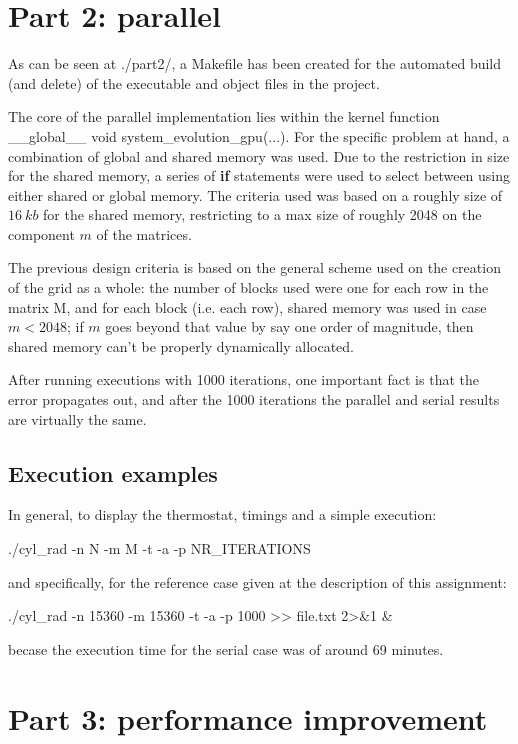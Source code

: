 \documentclass[paper=a4, fontsize=11pt]{scrartcl} %
\numberwithin{equation}{section} %
\numberwithin{figure}{section} %
\numberwithin{table}{section} %
\begin{document}
\section{Part 2: parallel}

As can be seen at ./part2/, a Makefile has been created for the automated build (and delete) of the executable and object files in the project.

The core of the parallel implementation lies within the kernel function \_\_global\_\_ void system\_evolution\_gpu(...). For the specific problem at hand, a combination of global and shared memory was used. Due to the restriction in size for the shared memory, a series of \textbf{if} statements were used to select between using either shared or global memory. The criteria used was based on a roughly size of $16 \ kb$ for the shared memory, restricting to a max size of roughly 2048 on the component $m$ of the matrices.

The previous design criteria is based on the general scheme used on the creation of the grid as a whole: the number of blocks used were one for each row in the matrix M, and for each block (i.e. each row), shared memory was used in case $m<2048$; if $m$ goes beyond that value by say one order of magnitude, then shared memory can't be properly dynamically allocated.

After running executions with 1000 iterations, one important fact is that the error propagates out, and after the 1000 iterations the parallel and serial results are virtually the same.

\subsection{Execution examples}

In general, to display the thermostat, timings and a simple execution:

./cyl\_rad -n N -m M -t -a -p NR\_ITERATIONS

and specifically, for the reference case given at the description of this assignment:

./cyl\_rad -n 15360 -m 15360 -t -a -p 1000 >> file.txt 2>\&1 \&

becase the execution time for the serial case was of around 69 minutes.


\section{Part 3: performance improvement}
\end{document}
